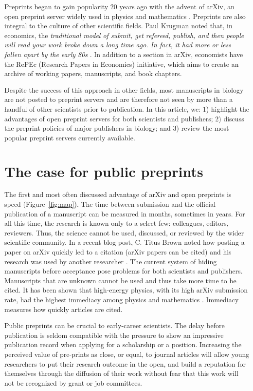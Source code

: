 \documentclass[10pt]{article}
\begin{document}
Preprints began to gain popularity 20 years ago with the advent of arXiv, an
open preprint server widely used in physics and mathematics \cite{gin11}.
Preprints are also integral to the culture of other scientific fields.  Paul
Krugman noted that, in economics, the \emph{traditional model of submit, get
refereed, publish, and then people will read your work broke down a long time
ago. In fact, it had more or less fallen apart by the early 80s} \cite{kru12}.
In addition to a section in arXiv, economists have the RePEc (Research Papers in
Economics) initiative, which aims to create an archive of working papers,
manuscripts, and book chapters.

Despite the success of this approach in other fields, most manuscripts in
biology are not posted to preprint servers and are therefore not seen by more
than a handful of other scientists prior to publication. In this article, we: 1)
highlight the advantages of open preprint servers for both scientists and
publishers; 2) discuss the preprint policies of major publishers in biology; and
3) review the most popular preprint servers currently available.

\section*{The case for public preprints}

The first and most often discussed advantage of arXiv and open preprints is
speed (Figure~\ref{fig:map}). The time between submission and the official
publication of a manuscript can be measured in months, sometimes in years. For
all this time, the research is known only to a select few: colleagues, editors,
reviewers. Thus, the science cannot be used, discussed, or reviewed by the wider
scientific community. In a recent blog post, C. Titus Brown noted how posting a
paper on arXiv quickly led to a citation (arXiv papers can be cited) and his
research was used by another researcher \cite{bro12}. The current system of
hiding manuscripts before acceptance pose problems for both scientists and
publishers. Manuscripts that are unknown cannot be used and thus take more time
to be cited. It has been shown that high-energy physics, with its high arXiv
submission rate, had the highest immediacy among physics and mathematics
\cite{pra05}. Immediacy measures how quickly articles are cited. 

Public preprints can be crucial to early-career scientists. The delay before
publication is seldom compatible with the pressure to show an impressive
publication record when applying for a scholarship or a position. Increasing the
perceived value of pre-prints as close, or equal, to journal articles will allow
young researchers to put their research outcome in the open, and build a
reputation for themselves through the diffusion of their work without fear that
this work will not be recognized by grant or job committees.
\end{document}
